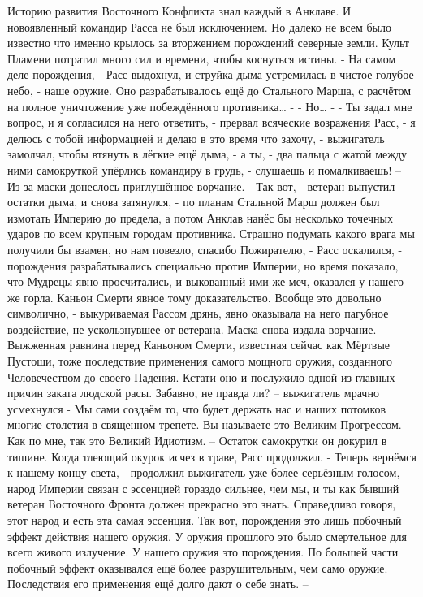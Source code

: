 \documentclass[a4paper, 12pt]{report}
\begin{document}
	Историю развития Восточного Конфликта знал каждый в Анклаве. И новоявленный командир Расса не был исключением. Но далеко не всем было известно что именно крылось за вторжением порождений северные земли. Культ Пламени потратил много сил и времени, чтобы коснуться истины.
	- На самом деле порождения, - Расс выдохнул, и струйка дыма устремилась в чистое голубое небо, - наше оружие. Оно разрабатывалось ещё до Стального Марша, с расчётом на полное уничтожение уже побеждённого противника… -
	- Но… -
	- Ты задал мне вопрос, и я согласился на него ответить, - прервал всяческие возражения Расс, - я делюсь с тобой информацией и делаю в это время что захочу, - выжигатель замолчал, чтобы втянуть в лёгкие ещё дыма, - а ты, - два пальца с жатой между ними самокруткой упёрлись командиру в грудь, - слушаешь и помалкиваешь! – 
	Из-за маски донеслось приглушённое ворчание.
	 - Так вот, - ветеран выпустил остатки дыма, и снова затянулся, - по планам Стальной Марш должен был измотать Империю до предела, а потом Анклав нанёс бы несколько точечных ударов по всем крупным городам противника. Страшно подумать какого врага мы получили бы взамен, но нам повезло, спасибо Пожирателю, - Расс оскалился, - порождения разрабатывались специально против Империи, но время показало, что Мудрецы явно просчитались, и выкованный ими же меч, оказался у нашего же горла. Каньон Смерти явное тому доказательство. Вообще это довольно символично, - выкуриваемая Рассом дрянь, явно оказывала на него пагубное воздействие, не ускользнувшее от ветерана. Маска снова издала ворчание.
- Выжженная равнина перед Каньоном Смерти, известная сейчас как Мёртвые Пустоши, тоже последствие применения самого мощного оружия, созданного Человечеством до своего Падения. Кстати оно и послужило одной из главных причин заката людской расы. Забавно, не правда ли? – выжигатель мрачно усмехнулся - Мы сами создаём то, что будет держать нас и наших потомков многие столетия в священном трепете. Вы называете это Великим Прогрессом. Как по мне, так это Великий Идиотизм. –
Остаток самокрутки он докурил в тишине. Когда тлеющий окурок исчез в траве, Расс продолжил.
- Теперь вернёмся к нашему концу света, - продолжил выжигатель уже более серьёзным голосом, - народ Империи связан с эссенцией гораздо сильнее, чем мы, и ты как бывший ветеран Восточного Фронта должен прекрасно это знать. Справедливо говоря, этот народ и есть эта самая эссенция. Так вот, порождения это лишь побочный эффект действия нашего оружия. У оружия прошлого это было смертельное для всего живого излучение. У нашего оружия это порождения. По большей части побочный эффект оказывался ещё более разрушительным, чем само оружие. Последствия его применения ещё долго дают о себе знать. –
\end{document}
